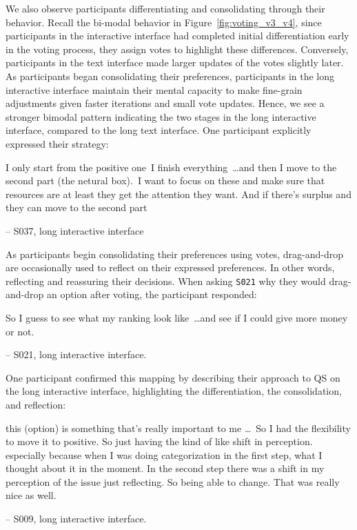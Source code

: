 We also observe participants differentiating and consolidating through their behavior. Recall the bi-modal behavior in Figure~\ref{fig:voting_v3_v4}, since participants in the interactive interface had completed initial differentiation early in the voting process, they assign votes to highlight these differences. Conversely, participants in the text interface made larger updates of the votes slightly later. As participants began consolidating their preferences, participants in the long interactive interface maintain their mental capacity to make fine-grain adjustments given faster iterations and small vote updates. Hence, we see a stronger bimodal pattern indicating the two stages in the long interactive interface, compared to the long text interface. One participant explicitly expressed their strategy:

\begin{displayquote}
    I only start from the positive one~\bracketellipsis I finish everything~\ldots and then I move to the second part (the netural box).~\bracketellipsis I want to focus on these and make sure that resources are at least they get the attention they want. And if there's surplus and they can move to the second part
    
    \noindent \hfill -- S037, long interactive interface
\end{displayquote}

As participants begin consolidating their preferences using votes, drag-and-drop are occasionally used to reflect on their expressed preferences. In other words, reflecting and reassuring their decisions. When asking \texttt{S021} why they would drag-and-drop an option after voting, the participant responded:

\begin{displayquote}
    So I guess to see what my ranking look like~\ldots and see if I could give more money or not.

    \noindent \hfill -- S021, long interactive interface.
\end{displayquote}

One participant confirmed this mapping by describing their approach to QS on the long interactive interface, highlighting the differentiation, the consolidation, and reflection:

\begin{displayquote}
\bracketellipsis this (option) is something that's really important to me \ldots\ So I had the flexibility to move it to positive. So just having the kind of like shift in perception. \bracketellipsis especially because when I was doing categorization in the first step, \bracketellipsis what I thought about it in the moment. \bracketellipsis In the second step there was a shift in my perception of the issue just reflecting. So being able to change. That was really nice as well.

\noindent \hfill -- S009, long interactive interface.
\end{displayquote}

